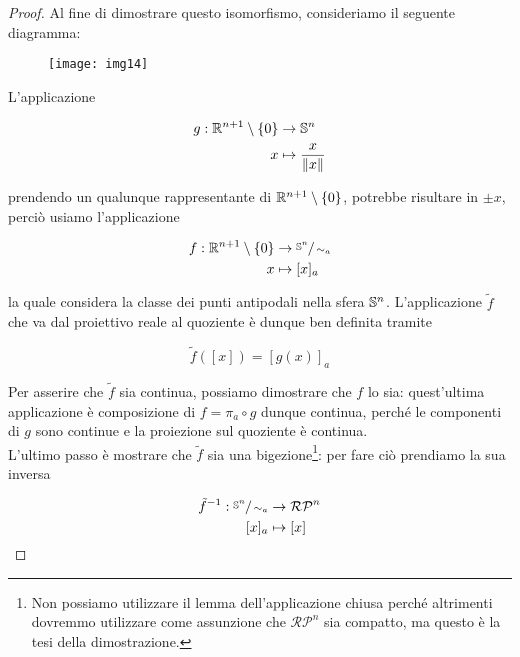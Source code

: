 \begin{proof}
	Al fine di dimostrare questo isomorfismo, consideriamo il seguente diagramma:
	
	\begin{figure}[H]
		\centering
		\texttt{[image: img14]}
	\end{figure}

	L'applicazione
	
	\begin{align}
		\begin{split}
			g : \R^{n+1} \setminus \{0\} &\to \S^{n}\\
			x &\mapsto \dfrac{x}{\norm{x}}
		\end{split}
	\end{align}

	prendendo un qualunque rappresentante di $ \R^{n+1} \setminus \{0\} $, potrebbe risultare in $ \pm x $, perciò usiamo l'applicazione
	
	\begin{align}
		\begin{split}
			f : \R^{n+1} \setminus \{0\} &\to \sfrac{\S^{n}}{\sim_{a}}\\
			x &\mapsto [x]_{a}
		\end{split}
	\end{align}

	la quale considera la classe dei punti antipodali nella sfera $ \S^{n} $. L'applicazione $ \tilde{f} $ che va dal proiettivo reale al quoziente è dunque ben definita tramite
	
	\begin{equation}
		\tilde{f}([x]) = [g(x)]_{a}
	\end{equation}

	Per asserire che $ \tilde{f} $ sia continua, possiamo dimostrare che $ f $ lo sia: quest'ultima applicazione è composizione di $ f = \pi_{a} \circ g $ dunque continua, perché le componenti di $ g $ sono continue e la proiezione sul quoziente è continua.\\
	L'ultimo passo è mostrare che $ \tilde{f} $ sia una bigezione\footnote{%
		Non possiamo utilizzare il lemma dell'applicazione chiusa perché altrimenti dovremmo utilizzare come assunzione che $ \mathcal{RP}^{n} $ sia compatto, ma questo è la tesi della dimostrazione.%
	}: per fare ciò prendiamo la sua inversa

	\begin{align}
		\begin{split}
			\tilde{f}^{-1} : \sfrac{\S^{n}}{\sim_{a}} &\to \mathcal{RP}^{n}\\
			[x]_{a} &\mapsto [x]
		\end{split}
	\end{align}


\end{proof}
